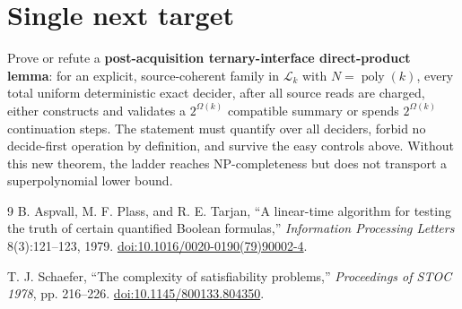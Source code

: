\documentclass[11pt]{article}
\begin{document}
\section*{Single next target}
Prove or refute a \textbf{post-acquisition ternary-interface direct-product
lemma}: for an explicit, source-coherent family in $\mathcal L_k$ with
$N=\operatorname{poly}(k)$, every total uniform deterministic exact decider,
after all source reads are charged, either constructs and validates a
$2^{\Omega(k)}$ compatible summary or spends $2^{\Omega(k)}$ continuation
steps.  The statement must quantify over all deciders, forbid no decide-first
operation by definition, and survive the easy controls above.  Without this
new theorem, the ladder reaches NP-completeness but does not transport a
superpolynomial lower bound.

\begin{thebibliography}{9}
B. Aspvall, M. F. Plass, and R. E. Tarjan,
``A linear-time algorithm for testing the truth of certain quantified Boolean
formulas,'' \emph{Information Processing Letters} 8(3):121--123, 1979.
\href{https://doi.org/10.1016/0020-0190(79)90002-4}{doi:10.1016/0020-0190(79)90002-4}.

T. J. Schaefer, ``The complexity of satisfiability problems,''
\emph{Proceedings of STOC 1978}, pp. 216--226.
\href{https://doi.org/10.1145/800133.804350}{doi:10.1145/800133.804350}.
\end{thebibliography}

\end{document}
